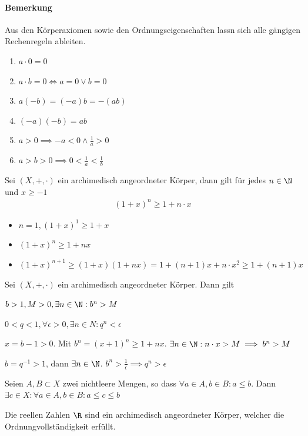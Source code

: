 \paragraph{Bemerkung}
Aus den Körperaxiomen sowie den Ordnungseigenschaften lassn sich alle gängigen
Rechenregeln ableiten.
\begin{enumerate}
	\item $a\cdot 0 =0$
	\item $a\cdot b = 0 \iff a=0 \lor b=0$
	\item $a(-b)=(-a)b=-(ab)$
	\item $(-a)(-b)=ab$
	\item $a>0\implies -a<0\land \frac{1}{a}>0$
	\item $a>b>0\implies 0<\frac{1}{a}<\frac{1}{b}$
\end{enumerate}
\begin{theorem}
	Sei $(X,+,\cdot)$ ein archimedisch angeordneter Körper, dann gilt für jedes $n\in\N$ und $x\geq -1$\begin{align*}
		(1+x)^n\geq 1+n\cdot x
	\end{align*}
\end{theorem}
\prove
\begin{itemize}
	\item[IA]$n=1, (1+x)^1\geq 1+x$
	\item[IB]$(1+x)^n\geq 1+nx$
	\item[IS]$(1+x)^{n+1}\geq(1+x)(1+nx)=1+(n+1)x+n\cdot x^2\geq 1+(n+1)x$
\end{itemize}
\begin{theorem}
	Sei $(X,+,\cdot)$ ein archimedisch angeordneter Körper. Dann gilt
	\begin{enumerateroman}
		\item $b>1, M>0, \exists n\in \N: b^n>M$
		\item $0<q<1, \forall\epsilon>0, \exists n\in N: q^n<\epsilon$
	\end{enumerateroman}
\end{theorem}
\prove
\begin{enumerateroman}
	\item $x=b-1>0$. Mit $b^n=(x+1)^n\geq 1+nx$. $\exists n\in \N:n\cdot x>M\implies b^n>M$
	\item $b=q^{-1}>1$, dann $\exists n\in \N$. $b^n>\frac{1}{\epsilon} \implies q^n>\epsilon$
\end{enumerateroman}
\begin{definition}[Ordnungsvollständigkeit]
	Seien $A,B\subset X$ zwei nichtleere Mengen, so dass $\forall a\in A, b\in B: a\leq b$. Dann $\exists c\in X: \forall a\in A, b \in B: a\leq c\leq b$
\end{definition}
\begin{definition}
	Die reellen Zahlen $\R$ sind ein archimedisch angeordneter Körper, welcher die Ordnungvollständigkeit erfüllt.
\end{definition}

